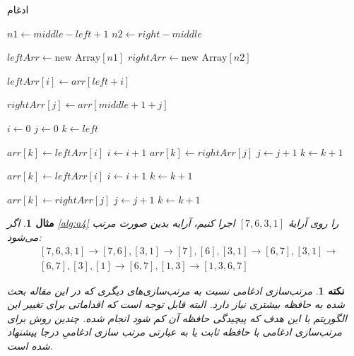 \documentclass[12pt]{article}
\newtheorem{remark}{نکته}
\newtheorem{example}{مثال}
\begin{document}
\begin{algorithm}[H]
  \caption{ادغام}
  \label{alg:a5}
  \begin{latin}
    \begin{algorithmic}[1]
      \State $n1 \gets middle - left + 1$
      \State $n2 \gets right - middle$

      \State $leftArr \gets \text{new Array}[n1]$
      \State $rightArr \gets \text{new Array}[n2]$

      \State $leftArr[i] \gets arr[left + i]$
      \EndFor

      \State $rightArr[j] \gets arr[middle + 1 + j]$
      \EndFor

      \State $i \gets 0$
      \State $j \gets 0$
      \State $k \gets left$

      \State $arr[k] \gets leftArr[i]$
      \State $i \gets i + 1$
      \Else
      \State $arr[k] \gets rightArr[j]$
      \State $j \gets j + 1$
      \EndIf
      \State $k \gets k + 1$
      \EndWhile

      \State $arr[k] \gets leftArr[i]$
      \State $i \gets i + 1$
      \State $k \gets k + 1$
      \EndWhile

      \State $arr[k] \gets rightArr[j]$
      \State $j \gets j + 1$
      \State $k \gets k + 1$
      \EndWhile
      \EndProcedure
    \end{algorithmic}
  \end{latin}
\end{algorithm}

\begin{example}
  اگر
  \cref{alg:a4}
  را روی آرایهٔ
  $[7, 6, 3, 1]$
  اجرا کنیم،
  آرایه بدین صورت مرتب می‌شود:
  \begin{align*}
     & [7, 6, 3, 1] \rightarrow [7, 6], [3, 1] \rightarrow
    [7], [6], [3, 1] \rightarrow [6, 7], [3, 1] \rightarrow    \\
     & [6, 7], [3], [1] \rightarrow [6, 7], [1, 3] \rightarrow
    [1, 3, 6, 7]
  \end{align*}
\end{example}

\begin{remark}
  مرتب‌سازی ادغامی نسبت به مرتب‌سازی‌های دیگری که در این مقاله بحث شده
  به حافظه بیشتری نیاز دارد. البته قابل توجه است که اقداماتی برای تغییر این الگوریتم
  با این هدف که پیچیدگی حافظه آن کم شود انجام شده.
  چندین روش برای مرتب‌سازی ادغامی با حافظه ثابت
  یا به عبارتی مرتب سازی ادغامیِ درجا
  پیشنهاد شده است.
  \cite{merge1}
\end{remark}
\end{document}
